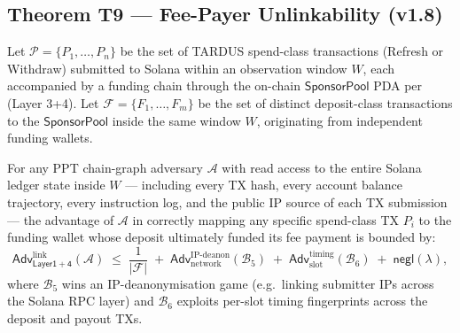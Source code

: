 \subsection{Theorem T9 --- Fee-Payer Unlinkability (v1.8)}
\label{sec:theorem-T9}

\begin{theorem}
\label{thm:T9}
Let $\mathcal{P} = \{P_1, \ldots, P_n\}$ be the set of TARDUS
spend-class transactions (Refresh or Withdraw) submitted to
Solana within an observation window $W$, each accompanied by a
funding chain through the on-chain $\mathsf{SponsorPool}$ PDA per
 (Layer 3+4). Let
$\mathcal{F} = \{F_1, \ldots, F_m\}$ be the set of distinct
deposit-class transactions to the $\mathsf{SponsorPool}$ inside
the same window $W$, originating from independent funding
wallets.

For any PPT chain-graph adversary $\mathcal{A}$ with read access
to the entire Solana ledger state inside $W$ — including every
TX hash, every account balance trajectory, every instruction
log, and the public IP source of each TX submission — the
advantage of $\mathcal{A}$ in correctly mapping any specific
spend-class TX $P_i$ to the funding wallet whose deposit
ultimately funded its fee payment is bounded by:
\[
  \mathsf{Adv}^{\mathrm{link}}_{\mathsf{Layer1{+}4}}(\mathcal{A}) \;\leq\;
  \frac{1}{|\mathcal{F}|} \;+\;
  \mathsf{Adv}^{\mathrm{IP\text{-}deanon}}_{\mathrm{network}}(\mathcal{B}_5) \;+\;
  \mathsf{Adv}^{\mathrm{timing}}_{\mathrm{slot}}(\mathcal{B}_6) \;+\;
  \mathsf{negl}(\lambda),
\]
where $\mathcal{B}_5$ wins an IP-deanonymisation game (e.g.\
linking submitter IPs across the Solana RPC layer) and
$\mathcal{B}_6$ exploits per-slot timing fingerprints across the
deposit and payout TXs.
\end{theorem}

